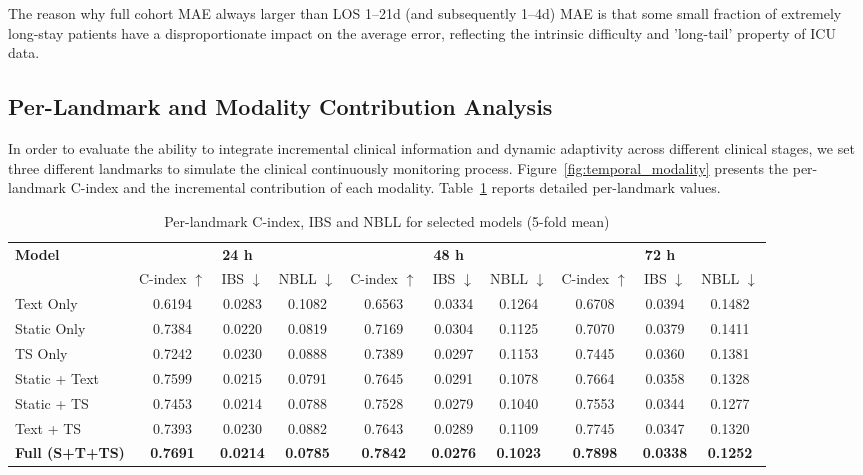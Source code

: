 \documentclass[10pt, a4paper]{article}
\begin{document}
The reason why full cohort MAE always larger than LOS 1--21d (and subsequently 1--4d) MAE is that some small fraction of extremely long-stay patients have a disproportionate impact on the average error, reflecting the intrinsic difficulty and 'long-tail' property of ICU data. 

\subsection{Per-Landmark and Modality Contribution Analysis}

In order to evaluate the ability to integrate incremental clinical information and dynamic adaptivity across different clinical stages, we set three different landmarks to simulate the clinical continuously monitoring process.  Figure~\ref{fig:temporal_modality} presents the per-landmark C-index and the incremental contribution of each modality. Table~\ref{tab:per_landmark} reports detailed per-landmark values.

\begin{table}[htbp]
\centering
\small 
\caption{Per-landmark C-index, IBS and NBLL for selected models (5-fold mean)}
\label{tab:per_landmark}
\setlength{\tabcolsep}{4pt} 
\begin{tabular}{l ccc ccc ccc}
\toprule
\multirow{2}{*}{\textbf{Model}} & \multicolumn{3}{c}{\textbf{24 h}} & \multicolumn{3}{c}{\textbf{48 h}} & \multicolumn{3}{c}{\textbf{72 h}} \\
\cmidrule(lr){2-4} \cmidrule(lr){5-7} \cmidrule(lr){8-10}
& C-index $\uparrow$& IBS $\downarrow$& NBLL $\downarrow$ & C-index $\uparrow$ & IBS $\downarrow$ & NBLL $\downarrow$ & C-index $\uparrow$ & IBS $\downarrow$ & NBLL $\downarrow$ \\
\midrule
Text Only     & 0.6194 & 0.0283 & 0.1082 & 0.6563 & 0.0334 & 0.1264 & 0.6708 & 0.0394 & 0.1482 \\
Static Only   & 0.7384 & 0.0220 & 0.0819 & 0.7169 & 0.0304 & 0.1125 & 0.7070 & 0.0379 & 0.1411 \\
TS Only       & 0.7242 & 0.0230 & 0.0888 & 0.7389 & 0.0297 & 0.1153 & 0.7445 & 0.0360 & 0.1381 \\
Static + Text & 0.7599 & 0.0215 & 0.0791 & 0.7645 & 0.0291 & 0.1078 & 0.7664 & 0.0358 & 0.1328 \\
Static + TS   & 0.7453 & 0.0214 & 0.0788 & 0.7528 & 0.0279 & 0.1040 & 0.7553 & 0.0344 & 0.1277 \\
Text + TS     & 0.7393 & 0.0230 & 0.0882 & 0.7643 & 0.0289 & 0.1109 & 0.7745 & 0.0347 & 0.1320 \\
\textbf{Full (S+T+TS)} & \textbf{0.7691} & \textbf{0.0214} & \textbf{0.0785} & \textbf{0.7842} & \textbf{0.0276} & \textbf{0.1023} & \textbf{0.7898} & \textbf{0.0338} & \textbf{0.1252} \\
\bottomrule
\end{tabular}
\end{table}
\end{document}
